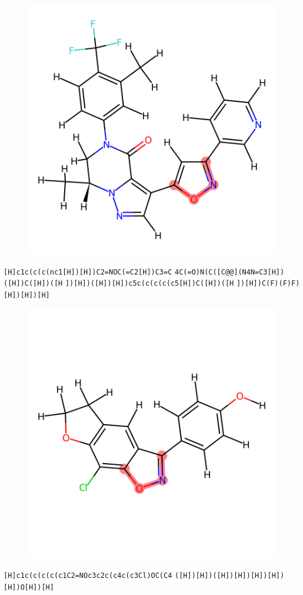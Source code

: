 \documentclass{article}
\begin{document}
\begin{figure}[ht]
\centering
    \includegraphics{mol20.png}
\end{figure}
\verb|[H]c1c(c(c(nc1[H])[H])C2=NOC(=C2[H])C3=C| \verb|4C(=O)N(C([C@@](N4N=C3[H])([H])C([H])([H| \verb|])[H])([H])[H])c5c(c(c(c(c5[H])C([H])([H| \verb|])[H])C(F)(F)F)[H])[H])[H]|

\clearpage

\begin{figure}[ht]
\centering
    \includegraphics{mol21.png}
\end{figure}
\verb|[H]c1c(c(c(c(c1C2=NOc3c2c(c4c(c3Cl)OC(C4| \verb|([H])[H])([H])[H])[H])[H])[H])O[H])[H]|
\end{document}
